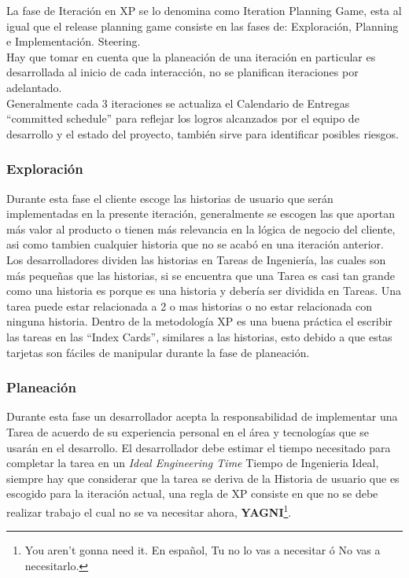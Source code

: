             La fase de Iteración en XP se lo denomina como Iteration Planning Game, esta al igual que  el release planning game consiste en las fases de: Exploración, Planning e Implementaci\'on. Steering.\\

            Hay que tomar en cuenta que la planeación de una iteración en particular es desarrollada al inicio de cada interacción, no se planifican iteraciones por adelantado.\\

            Generalmente cada 3 iteraciones se actualiza el Calendario de Entregas “committed schedule” para reflejar los logros alcanzados por el equipo de desarrollo y el estado del proyecto, también sirve para identificar posibles riesgos.\\

            \subsubsection{Exploración}
            \label{subs:exploracion}

            Durante esta fase el cliente escoge las historias de usuario que serán implementadas en la presente iteración, generalmente se escogen las que aportan más valor al producto o tienen más relevancia en la lógica de negocio del cliente, asi como tambien cualquier historia que no se acabó en una iteración anterior.\\

            Los desarrolladores dividen las historias en Tareas de Ingeniería, las cuales son más pequeñas que las historias, si se encuentra que una Tarea es casi tan grande como una historia es porque es una historia y debería ser dividida en Tareas. Una tarea puede estar relacionada a 2 o mas historias o no estar relacionada con ninguna historia. Dentro de la metodología XP es una buena práctica el escribir las tareas en las  “Index Cards”, similares a las historias, esto debido a que estas tarjetas son fáciles de manipular durante la fase de planeación.\\


            \subsubsection{Planeación}
            \label{subs:planeacion}

            Durante esta fase un desarrollador acepta la responsabilidad de implementar una Tarea de acuerdo de su experiencia personal en el área y tecnologías que se usarán en el desarrollo. El desarrollador debe estimar el tiempo necesitado para completar la tarea en un \emph{Ideal Engineering Time} Tiempo de Ingenieria Ideal, siempre hay que considerar que la tarea se deriva de la Historia de usuario que es escogido para la iteración actual, una regla de XP consiste en que no se debe realizar trabajo el cual no se va necesitar ahora, \textbf{YAGNI}\footnote{You aren't gonna need it. En espa\~nol, Tu no lo vas a necesitar \'o No vas a necesitarlo.}.\\

